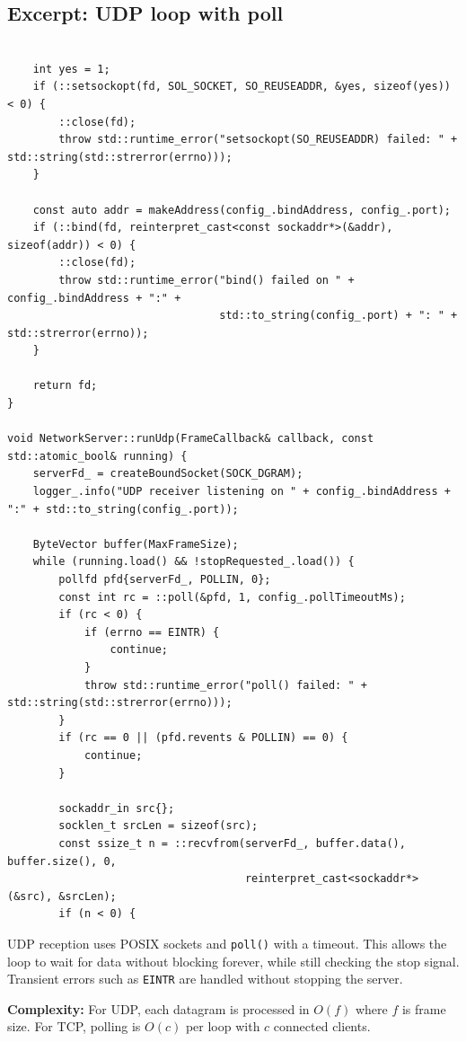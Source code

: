 \documentclass[10pt,a4paper]{article}
\newcommand{\complexity}[1]{\textbf{Complexity:} #1}
\begin{document}
\subsection{Excerpt: UDP loop with poll}
\begin{lstlisting}[caption={Linux UDP loop using poll}]

    int yes = 1;
    if (::setsockopt(fd, SOL_SOCKET, SO_REUSEADDR, &yes, sizeof(yes)) < 0) {
        ::close(fd);
        throw std::runtime_error("setsockopt(SO_REUSEADDR) failed: " + std::string(std::strerror(errno)));
    }

    const auto addr = makeAddress(config_.bindAddress, config_.port);
    if (::bind(fd, reinterpret_cast<const sockaddr*>(&addr), sizeof(addr)) < 0) {
        ::close(fd);
        throw std::runtime_error("bind() failed on " + config_.bindAddress + ":" +
                                 std::to_string(config_.port) + ": " + std::strerror(errno));
    }

    return fd;
}

void NetworkServer::runUdp(FrameCallback& callback, const std::atomic_bool& running) {
    serverFd_ = createBoundSocket(SOCK_DGRAM);
    logger_.info("UDP receiver listening on " + config_.bindAddress + ":" + std::to_string(config_.port));

    ByteVector buffer(MaxFrameSize);
    while (running.load() && !stopRequested_.load()) {
        pollfd pfd{serverFd_, POLLIN, 0};
        const int rc = ::poll(&pfd, 1, config_.pollTimeoutMs);
        if (rc < 0) {
            if (errno == EINTR) {
                continue;
            }
            throw std::runtime_error("poll() failed: " + std::string(std::strerror(errno)));
        }
        if (rc == 0 || (pfd.revents & POLLIN) == 0) {
            continue;
        }

        sockaddr_in src{};
        socklen_t srcLen = sizeof(src);
        const ssize_t n = ::recvfrom(serverFd_, buffer.data(), buffer.size(), 0,
                                     reinterpret_cast<sockaddr*>(&src), &srcLen);
        if (n < 0) {
\end{lstlisting}


UDP reception uses POSIX sockets and \texttt{poll()} with a timeout. This allows the loop to wait for data without blocking forever, while still checking the stop signal. Transient errors such as \texttt{EINTR} are handled without stopping the server.

\complexity{For UDP, each datagram is processed in $O(f)$ where $f$ is frame size. For TCP, polling is $O(c)$ per loop with $c$ connected clients.}
\end{document}
